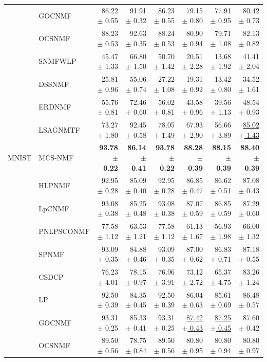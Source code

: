 \begin{landscape}
\begin{longtable}{llrrrrrr}
 & GOCNMF & 86.22 $\pm$ 0.55 & 91.91 $\pm$ 0.32 & 86.23 $\pm$ 0.55 & 79.15 $\pm$ 0.80 & 77.91 $\pm$ 0.95 & 80.42 $\pm$ 0.73 \\
 & OCSNMF & 88.23 $\pm$ 0.53 & 92.63 $\pm$ 0.35 & 88.24 $\pm$ 0.53 & 80.90 $\pm$ 0.94 & 79.71 $\pm$ 1.08 & 82.13 $\pm$ 0.82 \\
 & SNMFWLP & 45.47 $\pm$ 1.33 & 66.80 $\pm$ 1.50 & 50.70 $\pm$ 1.42 & 20.51 $\pm$ 2.28 & 13.68 $\pm$ 1.92 & 41.41 $\pm$ 2.04 \\
 & DSSNMF & 25.81 $\pm$ 0.96 & 55.06 $\pm$ 0.74 & 27.22 $\pm$ 1.08 & 19.31 $\pm$ 0.92 & 13.42 $\pm$ 0.80 & 34.52 $\pm$ 1.61 \\
 & ERDNMF & 55.76 $\pm$ 0.81 & 72.46 $\pm$ 0.60 & 56.02 $\pm$ 0.81 & 43.58 $\pm$ 0.96 & 39.56 $\pm$ 1.13 & 48.54 $\pm$ 0.93 \\
 & LSAGNMTF & 73.27 $\pm$ 1.80 & 92.45 $\pm$ 0.58 & 78.05 $\pm$ 1.49 & 67.93 $\pm$ 2.90 & 56.66 $\pm$ 3.89 & \underline{85.02 $\pm$ 1.43} \\
\midrule
MNIST & MCS-NMF & \textbf{93.78 $\pm$ 0.22} & \textbf{86.14 $\pm$ 0.41} & \textbf{93.78 $\pm$ 0.22} & \textbf{88.28 $\pm$ 0.39} & \textbf{88.15 $\pm$ 0.39} & \textbf{88.40 $\pm$ 0.39} \\
 & HLPNMF & 92.95 $\pm$ 0.28 & 85.09 $\pm$ 0.40 & 92.95 $\pm$ 0.28 & 86.85 $\pm$ 0.47 & 86.62 $\pm$ 0.51 & 87.08 $\pm$ 0.43 \\
 & LpCNMF & 93.08 $\pm$ 0.38 & 85.25 $\pm$ 0.48 & 93.08 $\pm$ 0.38 & 87.07 $\pm$ 0.59 & 86.85 $\pm$ 0.59 & 87.29 $\pm$ 0.60 \\
 & PNLPSCONMF & 77.58 $\pm$ 1.12 & 63.53 $\pm$ 1.21 & 77.58 $\pm$ 1.12 & 61.13 $\pm$ 1.67 & 56.93 $\pm$ 1.98 & 66.00 $\pm$ 1.32 \\
 & SPNMF & 93.09 $\pm$ 0.35 & 84.88 $\pm$ 0.46 & 93.09 $\pm$ 0.35 & 87.00 $\pm$ 0.62 & 86.83 $\pm$ 0.71 & 87.18 $\pm$ 0.55 \\
 & CSDCP & 76.23 $\pm$ 4.01 & 78.15 $\pm$ 0.97 & 76.96 $\pm$ 3.91 & 73.12 $\pm$ 2.72 & 65.37 $\pm$ 4.75 & 83.26 $\pm$ 1.24 \\
 & LP & 92.50 $\pm$ 0.39 & 84.35 $\pm$ 0.45 & 92.50 $\pm$ 0.39 & 86.04 $\pm$ 0.63 & 85.61 $\pm$ 0.69 & 86.48 $\pm$ 0.57 \\
 & GOCNMF & 93.31 $\pm$ 0.25 & 85.33 $\pm$ 0.41 & 93.31 $\pm$ 0.25 & \underline{87.42 $\pm$ 0.43} & \underline{87.25 $\pm$ 0.45} & 87.60 $\pm$ 0.42 \\
 & OCSNMF & 89.50 $\pm$ 0.56 & 78.75 $\pm$ 0.84 & 89.50 $\pm$ 0.56 & 80.80 $\pm$ 0.95 & 80.80 $\pm$ 0.94 & 80.80 $\pm$ 0.97 \\

\end{longtable}
\end{landscape}
